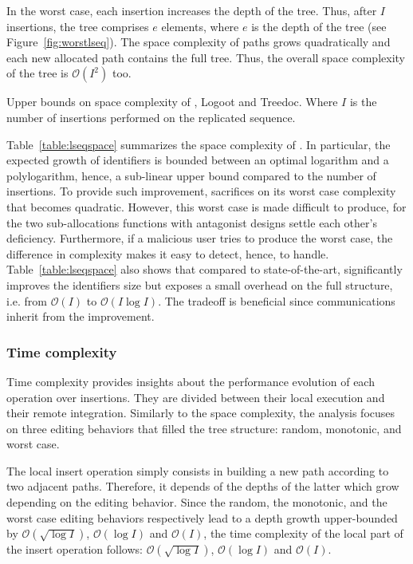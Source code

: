 In the worst case, each insertion increases the depth of the tree. Thus, after
$I$ insertions, the tree comprises $e$ elements, where $e$ is the depth of the
tree (see Figure~\ref{fig:worstlseq}). The space complexity of paths grows
quadratically and each new allocated path contains the full tree. Thus, the
overall space complexity of the tree is $\mathcal{O}(I^2)$ too.

\begin{table}
  \caption{\label{table:lseqspace}
    Upper bounds on space complexity of \LSEQ, Logoot and Treedoc. Where
    $I$ is the number of insertions performed on the replicated sequence.}
  \centering
  
\end{table}

Table~\ref{table:lseqspace} summarizes the space complexity of \LSEQ. In
particular, the expected growth of identifiers is bounded between an optimal
logarithm and a polylogarithm, hence, a sub-linear upper bound compared to the
number of insertions. To provide such improvement, \LSEQ sacrifices on its worst
case complexity that becomes quadratic. However, this worst case is made
difficult to produce, for the two sub-allocations functions with antagonist
designs settle each other's deficiency. Furthermore, if a malicious user tries
to produce the worst case, the difference in complexity makes it easy to detect,
hence, to handle. Table~\ref{table:lseqspace} also shows that compared to
state-of-the-art, \LSEQ significantly improves the identifiers size but exposes
a small overhead on the full structure, i.e. from $\mathcal{O}(I)$ to
$\mathcal{O}(I\log I)$. The tradeoff is beneficial since communications inherit
from the improvement.

\subsubsection{Time complexity}
\label{subsubsec:time}

Time complexity provides insights about the performance evolution of each
operation over insertions. They are divided between their local execution and
their remote integration.  Similarly to the space complexity, the analysis
focuses on three editing behaviors that filled the tree structure: random,
monotonic, and worst case.

The local insert operation simply consists in building a new path according to
two adjacent paths. Therefore, it depends of the depths of the latter which grow
depending on the editing behavior. Since the random, the monotonic, and the
worst case editing behaviors respectively lead to a depth growth upper-bounded
by $\mathcal{O}(\sqrt{\log I})$, $\mathcal{O}(\log I)$ and $\mathcal{O}(I)$, the
time complexity of the local part of the insert operation follows:
$\mathcal{O}(\sqrt{\log I})$, $\mathcal{O}(\log I)$ and $\mathcal{O}(I)$.

